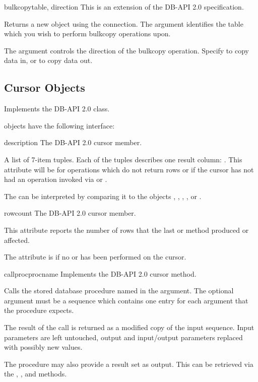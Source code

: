 \begin{methoddesc}[Connection]{bulkcopy}{table, direction}
This is an extension of the DB-API 2.0 specification.

Returns a new  object using the connection.  The
 argument identifies the table which you wish to perform
bulkcopy operations upon.

The  argument controls the direction of the bulkcopy
operation.  Specify  to copy data in, or
 to copy data out.
\end{methoddesc}

\subsection{Cursor Objects}

Implements the DB-API 2.0  class.

 objects have the following interface:

\begin{memberdesc}[Cursor]{description}
The DB-API 2.0 cursor  member.

A list of 7-item tuples.  Each of the tuples describes one result
column: .  This attribute will be  for
operations which do not return rows or if the cursor has not had an
operation invoked via  or .

The  can be interpreted by comparing it to the
 objects , ,
, , or .
\end{memberdesc}

\begin{memberdesc}[Cursor]{rowcount}
The DB-API 2.0 cursor  member.

This attribute reports the number of rows that the last
 or  method produced or
affected.

The attribute is  if no  or
 has been performed on the cursor.
\end{memberdesc}

\begin{methoddesc}[Cursor]{callproc}{procname }
Implements the DB-API 2.0 cursor  method.

Calls the stored database procedure named in the 
argument. The optional  argument must be a sequence
which contains one entry for each argument that the procedure expects.

The result of the call is returned as a modified copy of the input
sequence.  Input parameters are left untouched, output and
input/output parameters replaced with possibly new values.

The procedure may also provide a result set as output. This can be
retrieved via the , , and
 methods.
\end{methoddesc}

